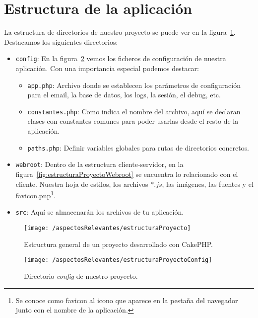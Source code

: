 \section{Estructura de la aplicación}

La estructura de directorios de nuestro proyecto se puede ver en la figura~\ref{fig:estructuraProyecto}. Destacamos los siguientes directorios:

\begin{itemize}
	\item \verb|config|: En la figura~\ref{fig:estructuraProyectoConfig} vemos los ficheros de configuración de nuestra aplicación. Con una importancia especial podemos destacar: 
	\begin{itemize}
		\item \verb|app.php|: Archivo donde se establecen los parámetros de configuración para el email, la base de datos, los logs, la sesión, el debug, etc.
		\item \verb|constantes.php|: Como indica el nombre del archivo, aquí se declaran clases con constantes comunes para poder usarlas desde el resto de la aplicación.
		\item \verb|paths.php|: Definir variables globales para rutas de directorios concretos.
	\end{itemize}
		
	\item \verb|webroot|: Dentro de la estructura cliente-servidor, en la figura~\ref{fig:estructuraProyectoWebroot} se encuentra lo relacionado con el cliente. Nuestra hoja de estilos, los archivos $*.js$, las imágenes, las fuentes y el favicon.pnp\footnote{Se conoce como favicon al icono que aparece en la pestaña del navegador junto con el nombre de la aplicación.}.
	
	\item \verb|src|: Aquí se almacenarán los archivos de tu aplicación.
\end{itemize}

\begin{figure}[ht]
	\centering
	\texttt{[image: /aspectosRelevantes/estructuraProyecto]}
	\caption{Estructura general de un proyecto desarrollado con CakePHP.}
	\label{fig:estructuraProyecto}
\end{figure}

\begin{figure}[ht]
	\centering
	\texttt{[image: /aspectosRelevantes/estructuraProyectoConfig]}
	\caption{Directorio \textit{config} de nuestro proyecto.}
	\label{fig:estructuraProyectoConfig}
\end{figure}

